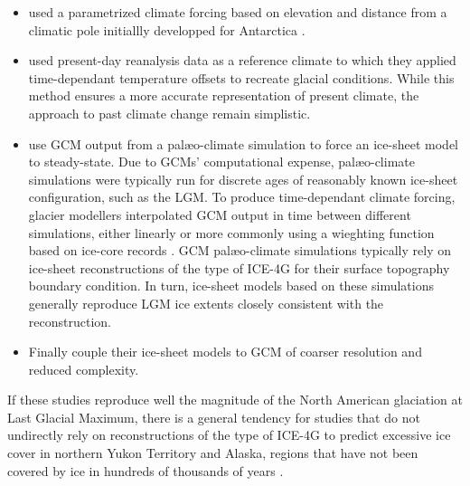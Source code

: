 \begin{itemize}

  \item \citet{johnson-fastook-2002} used a parametrized climate forcing based on elevation and distance from a climatic pole initiallly developped for Antarctica \citep{fastook-prentice-1994}.

  \item \citet{bintanja-etal-2005} used present-day reanalysis data as a reference climate to which they applied time-dependant temperature offsets to recreate glacial conditions. While this method ensures a more accurate representation of present climate, the approach to past climate change remain simplistic.

  \item \citet{huybrechts-tsiobbel-1996} use GCM output from a palæo-climate simulation to force an ice-sheet model to steady-state. Due to GCMs' computational expense, palæo-climate simulations were typically run for discrete ages of reasonably known ice-sheet configuration, such as the LGM. To produce time-dependant climate forcing, glacier modellers interpolated GCM output in time between different simulations, either linearly \citep{charbit-etal-2002} or more commonly using a wieghting function based on ice-core records \citep{marshall-clarke-1999,tarasov-peltier-2004,zweck-huybrechts-2005,gregoire-etal-2012}. GCM palæo-climate simulations typically rely on ice-sheet reconstructions of the type of ICE-4G \citep{peltier-1994} for their surface topography boundary condition. In turn, ice-sheet models based on these simulations generally reproduce LGM ice extents closely consistent with the reconstruction.

  \item Finally \citet{yoshimori-etal-2001,calov-etal-2002,abeouchi-etal-2007,charbit-etal-2013} couple their ice-sheet models to GCM of coarser resolution and reduced complexity.

\end{itemize}


If these studies reproduce well the magnitude of the North American glaciation at Last Glacial Maximum, there is a general tendency for studies that do not undirectly rely on reconstructions of the type of ICE-4G\citep{johnson-fastook-2002,bintanja-etal-2005,huybrechts-tsiobbel-1996,charbit-etal-2002,marshall-clarke-1999,tarasov-peltier-2004,zweck-huybrechts-2005,gregoire-etal-2012}  to predict excessive ice cover in northern Yukon Territory and Alaska, regions that have not been covered by ice in hundreds of thousands of years \citep{dukrodkin-1999,kaufman-manley-2004}.

